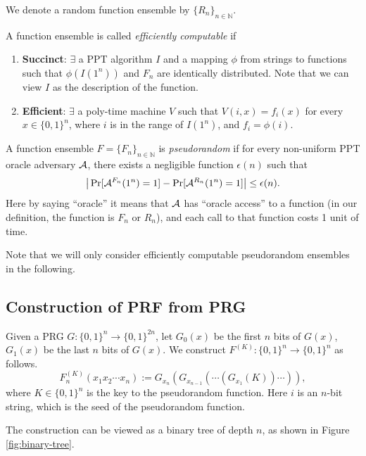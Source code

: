 \documentclass[12pt]{tufte-book}
\begin{document}
\begin{definition}
We denote a random function ensemble by $\{R_n\}_{n \in \mathbb{N}}$.
\end{definition}

\begin{definition}
A function ensemble is called \emph{efficiently computable} if
\begin{enumerate}[label=(\alph*)]
    \item \textbf{Succinct}:
        $\exists$ a PPT algorithm $I$ and a mapping $\phi$ from strings to functions such that
        $\phi(I(1^n))$ and $F_n$ are identically distributed.
        Note that we can view $I$ as the description of the function.
    \item \textbf{Efficient}:
        $\exists$ a poly-time machine $V$ such that
        $V(i, x) = f_i(x)$ for every $x \in \{0, 1\}^n$, where $i$ is in the range of $I(1^n)$, and $f_i = \phi(i)$.
\end{enumerate}
\end{definition}

\begin{definition}
A function ensemble $F = \{F_n\}_{n \in \mathbb{N}}$ is \emph{pseudorandom} if
for every non-uniform PPT oracle adversary $\mathcal{A}$, there exists a negligible function $\epsilon(n)$ such that
\[
\big| \Pr[\mathcal{A}^{F_n} (1^n) = 1] - \Pr[\mathcal{A}^{R_n} (1^n) = 1]  \big| \leq \epsilon(n).
\]
Here by saying ``oracle'' it means that $\mathcal{A}$ has ``oracle access'' to a function (in our definition, the function is $F_n$ or $R_n$), and each call to that function costs 1 unit of time.
\end{definition}

Note that we will only consider efficiently computable pseudorandom ensembles in the following.

\subsection{Construction of PRF from PRG}

\begin{construction}
Given a PRG $G: \{0, 1\}^n \rightarrow \{0, 1\}^{2n}$,
let $G_0(x)$ be the first $n$ bits of $G(x)$, $G_1(x)$ be the last $n$ bits of $G(x)$.
We construct $F^{(K)}: \{0, 1\}^n \rightarrow \{0, 1\}^n$ as follows.
\[
F^{(K)}_n(x_1 x_2 \cdots x_n) := G_{x_n}(G_{x_{n-1}} (\cdots(G_{x_1}(K)) \cdots  )),
\]
where $K \in \{0,1\}^n$ is the key to the pseudorandom function. Here $i$ is an $n$-bit string, which is the seed of the pseudorandom function.
\end{construction}
The construction can be viewed as a binary tree of depth $n$, as shown in Figure \ref{fig:binary-tree}.
\end{document}
